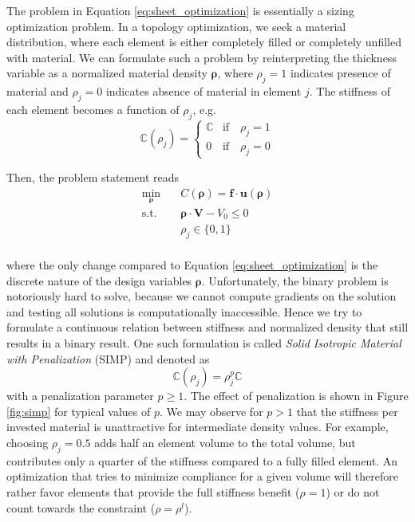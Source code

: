 The problem in Equation \eqref{eq:sheet_optimization} is essentially a sizing optimization problem. In a topology optimization, we seek a material distribution, where each element is either completely filled or completely unfilled with material. We can formulate such a problem by reinterpreting the thickness variable as a normalized material density $\pmb{\rho}$, where $\rho_j=1$ indicates presence of material and $\rho_j=0$ indicates absence of material in element $j$. The stiffness of each element becomes a function of $\rho_j$, e.g. 
\begin{equation}
    \mathbb{C}(\rho_j)=
    \begin{cases}
        \mathbb{C} & \text{if} \quad \rho_j = 1 \\
        0          & \text{if} \quad \rho_j = 0
    \end{cases}
\end{equation}

Then, the problem statement reads
\begin{equation}
    \begin{aligned}
        \min_{\pmb{\rho}} \quad & C(\pmb{\rho}) = \mathbf{f} \cdot \mathbf{u}(\pmb{\rho})\\
        \textrm{s.t.} \quad & \pmb{\rho} \cdot \mathbf{V} - V_0 \le 0  \\
                            & \rho_j \in \{0, 1\}\\
    \end{aligned}
    \label{eq:topology_optimization}
\end{equation}

where the only change compared to Equation \eqref{eq:sheet_optimization} is the discrete nature of the design variables $\pmb{\rho}$. Unfortunately, the binary problem is notoriously hard to solve, because we cannot compute gradients on the solution and testing all solutions is computationally inaccessible. Hence we try to formulate a continuous relation between stiffness and normalized density that still results in a binary result. One such formulation is called \emph{Solid Isotropic Material with Penalization} (SIMP) and denoted as 
\begin{equation}
    \mathbb{C}(\rho_j)= \rho_j^p \mathbb{C}
\end{equation}
with a penalization parameter $p \ge 1$. The effect of penalization is shown in Figure \ref{fig:simp} for typical values of $p$. We may observe for $p>1$ that the stiffness per invested material is unattractive for intermediate density values. For example, choosing $\rho_j=0.5$ adds half an element volume to the total volume, but contributes only a quarter of the stiffness compared to a fully filled element. An optimization that tries to minimize compliance for a given volume will therefore rather favor elements that provide the full stiffness benefit ($\rho=1$) or do not count towards the constraint ($\rho=\rho^l$). 

